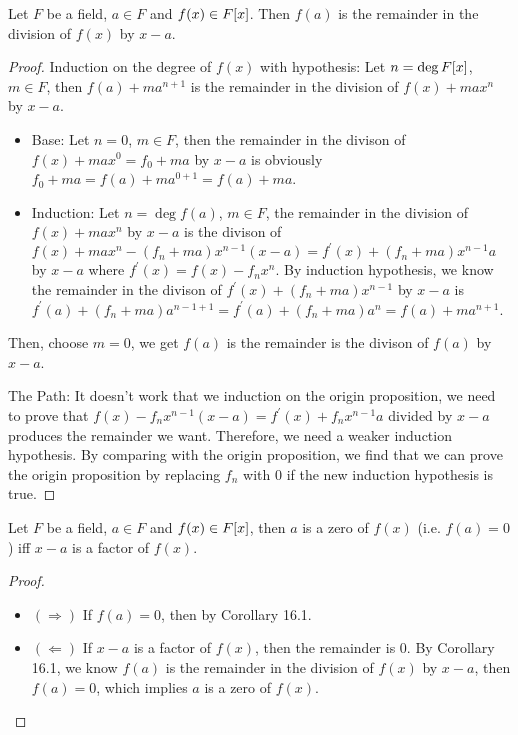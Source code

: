 \documentclass[../main.tex]{subfiles}
\begin{document}
\begin{corollary}
  Let $F$ be a field, $a \in F$ and $f(x) \in F[x]$. Then $f(a)$
  is the remainder in the division of $f(x)$ by $x - a$.
\end{corollary}
\begin{proof}
  Induction on the degree of $f(x)$ with hypothesis:
  Let $n = \deg F[x]$, $m \in F$, then $f(a) + ma^{n + 1}$
  is the remainder in the division of $f(x) + max^n$ by $x - a$.
  \begin{itemize}
    \item Base: Let $n = 0$, $m \in F$, then the remainder
          in the divison of $f(x) + max^0 = f_0 + ma$ by $x - a$
          is obviously $f_0 + ma = f(a) + ma^{0 + 1} = f(a) + ma$.
    \item Induction: Let $n = \deg f(a)$, $m \in F$, the remainder in 
          the division of $f(x) + max^n$ by $x - a$ is
          the divison of $f(x) + max^n - (f_n + ma)x^{n - 1}(x - a) = f^\prime(x) + (f_n + ma)x^{n - 1}a$ by $x - a$
          where $f^\prime(x) = f(x) - f_n x^n$.
          By induction hypothesis, we know the remainder in the divison of $f^\prime(x) + (f_n + ma)x^{n - 1}$
          by $x - a$ is $f^\prime(a) + (f_n + ma)a^{n - 1 + 1} = f^\prime(a) + (f_n + ma)a^n = f(a) + ma^{n + 1}$.
  \end{itemize}

  Then, choose $m = 0$, we get $f(a)$ is the remainder is the divison of $f(a)$ by $x - a$.

  The Path: It doesn't work that we induction on the origin proposition,
  we need to prove that 
  $f(x) - f_n x^{n - 1} (x - a) = f^\prime(x) + f_n x^{n - 1} a$ 
  divided by $x - a$ produces the remainder we want.
  Therefore, we need a weaker induction hypothesis. By comparing with the origin proposition,
  we find that we can prove the origin proposition by replacing $f_n$ with $0$ if the new induction hypothesis
  is true.
\end{proof}

\begin{corollary}
  Let $F$ be a field, $a \in F$ and $f(x) \in F[x]$, then
  $a$ is a zero of $f(x)$ (i.e. $f(a) = 0$) iff $x - a$ is a factor
  of $f(x)$.
\end{corollary}
\begin{proof}
  ~
  \begin{itemize}
    \item $(\Rightarrow)$ If $f(a) = 0$, then by Corollary 16.1.
    \item $(\Leftarrow)$ If $x - a$ is a factor of $f(x)$, then the remainder is $0$.
          By Corollary 16.1, we know $f(a)$ is the remainder 
          in the division of $f(x)$ by $x - a$, then $f(a) = 0$, which implies $a$ is a zero of $f(x)$.
  \end{itemize}
\end{proof}
\end{document}
